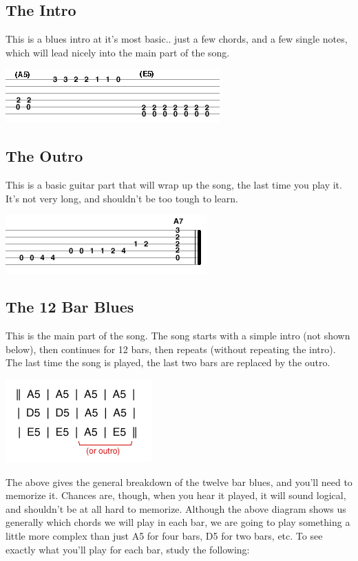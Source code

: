 \subsection{The Intro}
This is a blues intro at it's most basic.. just a few chords, and a few single notes, which will lead nicely into the main part of the song. 

\includegraphics{partfive/shuffleintrotab.png}

\subsection{The Outro}
This is a basic guitar part that will wrap up the song, the last time you play it. It's not very long, and shouldn't be too tough to learn. 

\includegraphics{partfive/shuffleoutrotab.png}

\subsection{The 12 Bar Blues}
This is the main part of the song. The song starts with a simple intro (not shown below), then continues for 12 bars, then repeats (without repeating the intro). The last time the song is played, the last two bars are replaced by the outro. 

\includegraphics{partfive/shufflebluesform.png}

The above gives the general breakdown of the twelve bar blues, and you'll need to memorize it. Chances are, though, when you hear it played, it will sound logical, and shouldn't be at all hard to memorize.
Although the above diagram shows us generally which chords we will play in each bar, we are going to play something a little more complex than just A5 for four bars, D5 for two bars, etc. To see exactly what you'll play for each bar, study the following: 

